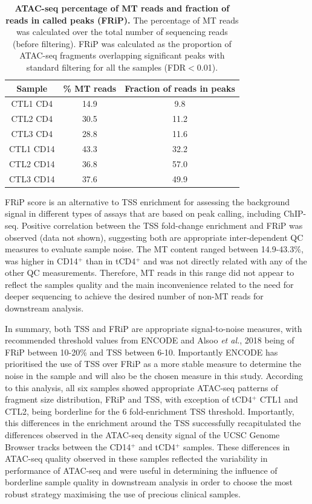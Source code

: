 \begin{table}[htbp]
\centering
\begin{tabular}{@{} c c c}
\toprule
\textbf{Sample} & \textbf{\% MT reads} & \textbf{Fraction of reads in peaks} \\
\midrule
\midrule
CTL1 CD4 & 14.9 & 9.8 \\
CTL2 CD4 & 30.5 & 11.2 \\
CTL3 CD4 & 28.8 & 11.6 \\
CTL1 CD14 & 43.3 & 32.2 \\
CTL2 CD14 & 36.8 & 57.0 \\
CTL3 CD14 & 37.6 & 49.9 \\
\bottomrule
\end{tabular}
\medskip %
\caption[ATAC-seq percentage of MT reads and fraction of reads in called peaks (FRiP).]{\textbf{ATAC-seq percentage of MT reads and fraction of reads in called peaks (FRiP).} The percentage of MT reads was calculated over the total number of sequencing reads (before filtering). FRiP was calculated as the proportion of ATAC-seq fragments overlapping significant peaks with standard filtering for all the samples (FDR$<$0.01).}
\label{tab:ATAC_MT_fraction_reads_in_peaks}
\end{table}
\bigskip %


FRiP score is an alternative to TSS enrichment for assessing the background signal in different types of assays that are based on peak calling, including ChIP-seq. Positive correlation between the TSS fold-change enrichment and FRiP was observed (data not shown), suggesting both are appropriate inter-dependent QC measures to evaluate sample noise.  The MT content ranged between 14.9-43.3\%, was higher in CD14$^+$ than in tCD4$^+$ and was not directly related with any of the other QC measurements. Therefore, MT reads in this range did not appear to reflect the samples quality and the main inconvenience related to the need for deeper sequencing to achieve the desired number of non-MT reads for downstream analysis.

In summary, both TSS and FRiP are appropriate signal-to-noise measures, with recommended threshold values from ENCODE and Alsoo \textit{et al.}, 2018 being of FRiP between 10-20\% and TSS between 6-10. Importantly ENCODE has prioritised the use of TSS over FRiP as a more stable measure to determine the noise in the sample and will also be the chosen measure in this study. According to this analysis, all six samples showed appropriate ATAC-seq patterns of fragment size distribution, FRiP and TSS, with exception of tCD4$^+$ CTL1 and CTL2, being borderline for the 6 fold-enrichment TSS threshold. Importantly, this differences in the enrichment around the TSS successfully recapitulated the differences observed in the ATAC-seq density signal of the UCSC Genome Browser tracks between the CD14$^+$ and tCD4$^+$ samples. These differences in ATAC-seq quality observed in these samples reflected the variability in performance of ATAC-seq and were useful in determining the influence of borderline sample quality in downstream analysis in order to choose the most robust strategy maximising the use of precious clinical samples. 
	

